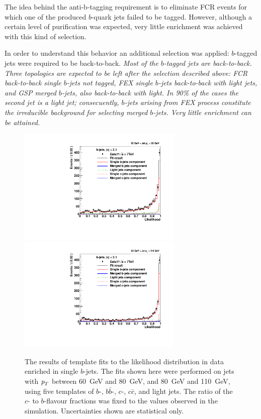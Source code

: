 The idea behind the anti-b-tagging requirement is to eliminate FCR events for which one of the produced $b$-quark jets failed to be tagged. However, although a certain level of purification was expected, very little enrichment was achieved with this kind of selection. 

In order to understand this behavior an additional selection was applied: $b$-tagged jets were required to be back-to-back.   %
\emph{Most of the $b$-tagged jets are back-to-back. Three topologies are expected to be left after the selection described above: FCR back-to-back single $b$-jets not tagged,  FEX single $b$-jets back-to-back with light jets, and GSP merged $b$-jets, also back-to-back with light.  In 90\% of the cases the second jet is a light jet; consecuently, $b$-jets arising from FEX process constitute the irreducible background for selecting merged $b$-jets. Very little enrichment can be attained.}

 
 







\begin{figure}[tp]
\centering
\includegraphics[width=0.7\textwidth]{FIGS/Fits/LikelihoodFit_3param_ETAFull_DataEnriched2btag_Bin1.pdf}
\includegraphics[width=0.7\textwidth]{FIGS/Fits/LikelihoodFit_3param_ETAFull_DataEnriched2btag_Bin2.pdf}
\caption{The results of template fits to the likelihood distribution in data enriched in single $b$-jets. The fits shown here were performed on jets with ${\emph{p}_{T}}$ between  60~GeV and 80~GeV, and 80~GeV and 110~GeV, using five templates of $b$-, $b\bar{b}$-, $c$-, $c\bar{c}$, and light jets.  The ratio of the $c$- to $b$-flavour fractions was fixed to the values observed in the simulation.  Uncertainties shown are statistical only.}
\label{fig:fitenriched2btag1}
\end{figure}




